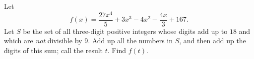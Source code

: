 Let
\[f(x)=\dfrac{27x^4}{5}+3x^3-4x^2-\dfrac{4x}{3}+167.\]
Let $S$ be the set of all three-digit positive integers whose digits add up to $18$ and which are \emph{not} divisible by $9$. Add up all the numbers in $S$, and then add up the digits of this sum; call the result $t$. Find $f(t)$.
